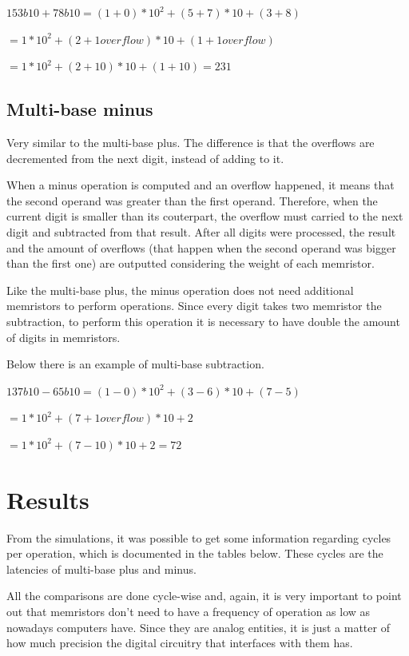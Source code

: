 \documentclass[ecp,tc,english]{iiufrgs}
\begin{document}
$ 153b10 + 78b10 = (1+0)*10^2 + (5+7)*10 + (3+8) $

$ = 1*10^2 + (2 + 1 overflow)*10 + (1 + 1 overflow) $

$ = 1*10^2 + (2 + 10)*10 + (1 + 10) = 231 $

\section{Multi-base minus}

Very similar to the multi-base plus. The difference is that the overflows are decremented from the next digit, instead of adding to it.

When a minus operation is computed and an overflow happened, it means that the second operand was greater than the first operand. Therefore, when the current digit is smaller than its couterpart, the overflow must carried to the next digit and subtracted from that result. After all digits were processed, the result and the amount of overflows (that happen when the second operand was bigger than the first one) are outputted considering the weight of each memristor.

Like the multi-base plus, the minus operation does not need additional memristors to perform operations. Since every digit takes two memristor the subtraction, to perform this operation it is necessary to have double the amount of digits in memristors.

Below there is an example of multi-base subtraction.

$ 137b10 - 65b10 = (1-0)*10^2 + (3-6)*10 + (7-5) $

$ = 1*10^2 + (7 + 1 overflow)*10 + 2 $

$ = 1*10^2 + (7 - 10)*10 + 2 = 72 $

\chapter{Results}

From the simulations, it was possible to get some information regarding cycles per operation, which is documented in the tables below. These cycles are the latencies of multi-base plus and minus.

All the comparisons are done cycle-wise and, again, it is very important to point out that memristors don't need to have a frequency of operation as low as nowadays computers have. Since they are analog entities, it is just a matter of how much precision the digital circuitry that interfaces with them has.
\end{document}
